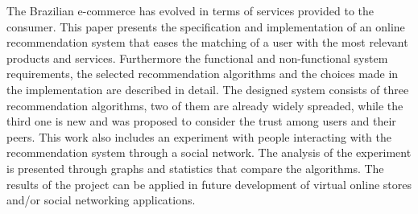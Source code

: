 The Brazilian e-commerce has evolved in terms of services provided to the consumer. This paper presents the specification and implementation of an online recommendation system that eases the matching of a user with the most relevant products and services. Furthermore the functional and non-functional system requirements, the selected recommendation algorithms and the choices made in the implementation are described in detail.
The designed system consists of three recommendation algorithms, two of them are already widely spreaded, while the third one is new and was proposed to consider the trust among users and their peers.
This work also includes an experiment with people interacting with the recommendation system through a social network. The analysis of the experiment is presented through graphs and statistics that compare the algorithms.
The results of the project can be applied in future development of virtual online stores and/or social networking applications.